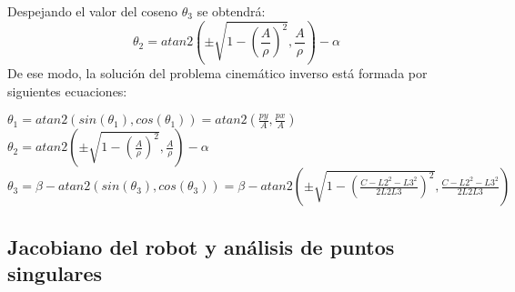 	Despejando el valor del coseno $\theta_{3}$ se obtendrá:
	\begin{equation}
	\theta_{2}=atan2(\pm \sqrt{1-(\frac{A}{\rho})^{2}},\frac{A}{\rho})-\alpha
	\end{equation}
	De ese modo, la solución del problema cinemático inverso está formada por siguientes ecuaciones:
	\begin{center}
		$\theta_{1}=atan2(sin(\theta_{1}),cos(\theta_{1}))=atan2(\frac{py}{A},\frac{px}{A})$ \\
		$\theta_{2}=atan2(\pm \sqrt{1-(\frac{A}{\rho})^{2}},\frac{A}{\rho})-\alpha$ \\
		$\theta_{3}=\beta -atan2(sin(\theta_{3}),cos(\theta_{3}))=\beta-atan2(\pm \sqrt{1-(\frac{C-L2^{2}-L3^{2}}{2L2L3})^{2}},\frac{C-L2^{2}-L3^{2}}{2L2L3} )$
	\end{center}
	\subsection{Jacobiano del robot y análisis de puntos singulares}
	